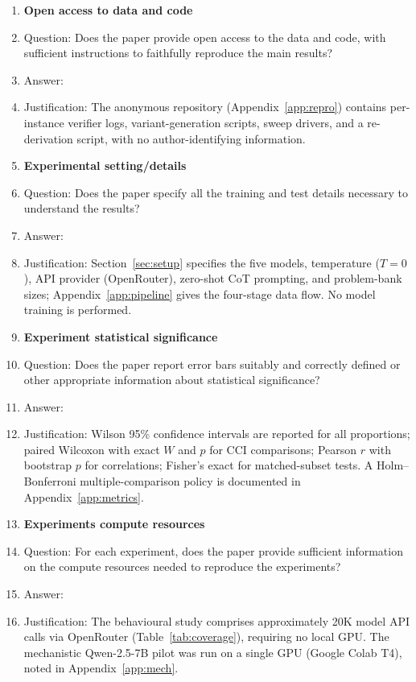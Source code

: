 \begin{enumerate}
\item {\bf Open access to data and code}
    \item[] Question: Does the paper provide open access to the data and code,
    with sufficient instructions to faithfully reproduce the main results?
    \item[] Answer: \answerYes{}
    \item[] Justification: The anonymous repository (Appendix~\ref{app:repro})
    contains per-instance verifier logs, variant-generation scripts, sweep
    drivers, and a re-derivation script, with no author-identifying
    information.

\item {\bf Experimental setting/details}
    \item[] Question: Does the paper specify all the training and test details
    necessary to understand the results?
    \item[] Answer: \answerYes{}
    \item[] Justification: Section~\ref{sec:setup} specifies the five models,
    temperature ($T{=}0$), API provider (OpenRouter), zero-shot CoT prompting,
    and problem-bank sizes; Appendix~\ref{app:pipeline} gives the four-stage
    data flow. No model training is performed.

\item {\bf Experiment statistical significance}
    \item[] Question: Does the paper report error bars suitably and correctly
    defined or other appropriate information about statistical significance?
    \item[] Answer: \answerYes{}
    \item[] Justification: Wilson 95\% confidence intervals are reported for all
    proportions; paired Wilcoxon with exact $W$ and $p$ for CCI comparisons;
    Pearson $r$ with bootstrap $p$ for correlations; Fisher's exact for
    matched-subset tests. A Holm--Bonferroni multiple-comparison policy is
    documented in Appendix~\ref{app:metrics}.

\item {\bf Experiments compute resources}
    \item[] Question: For each experiment, does the paper provide sufficient
    information on the compute resources needed to reproduce the experiments?
    \item[] Answer: \answerYes{}
    \item[] Justification: The behavioural study comprises approximately 20K
    model API calls via OpenRouter (Table~\ref{tab:coverage}), requiring no
    local GPU. The mechanistic Qwen-2.5-7B pilot was run on a single GPU
    (Google Colab T4), noted in Appendix~\ref{app:mech}.


\end{enumerate}
